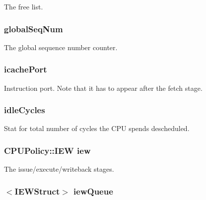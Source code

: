 \label{classFullO3CPU_ad5655f9bbf3c5b09877a612be7fc6b65}
The free list. \hypertarget{classFullO3CPU_a5f72a799d8b189b4fccda3cde457145e}{
\subsubsection[{globalSeqNum}]{ {\bf globalSeqNum}}}
\label{classFullO3CPU_a5f72a799d8b189b4fccda3cde457145e}
The global sequence number counter. \hypertarget{classFullO3CPU_a290723656a84b9cc90dfce377af9aad0}{
\subsubsection[{icachePort}]{ {\bf icachePort}}}
\label{classFullO3CPU_a290723656a84b9cc90dfce377af9aad0}
Instruction port. Note that it has to appear after the fetch stage. \hypertarget{classFullO3CPU_a42e0f4c18fdb8ef7504f5c45d697fb14}{
\subsubsection[{idleCycles}]{ {\bf idleCycles}}}
\label{classFullO3CPU_a42e0f4c18fdb8ef7504f5c45d697fb14}
Stat for total number of cycles the CPU spends descheduled. \hypertarget{classFullO3CPU_afbb39e841c20e3affe28f4ca3e8c0992}{
\subsubsection[{iew}]{\setlength{\rightskip}{0pt plus 5cm}CPUPolicy::IEW {\bf iew}}}
\label{classFullO3CPU_afbb39e841c20e3affe28f4ca3e8c0992}
The issue/execute/writeback stages. \hypertarget{classFullO3CPU_a9429710408b27da398dc15a2eb80b9fc}{
\subsubsection[{iewQueue}]{$<${\bf IEWStruct}$>$ {\bf iewQueue}}}
